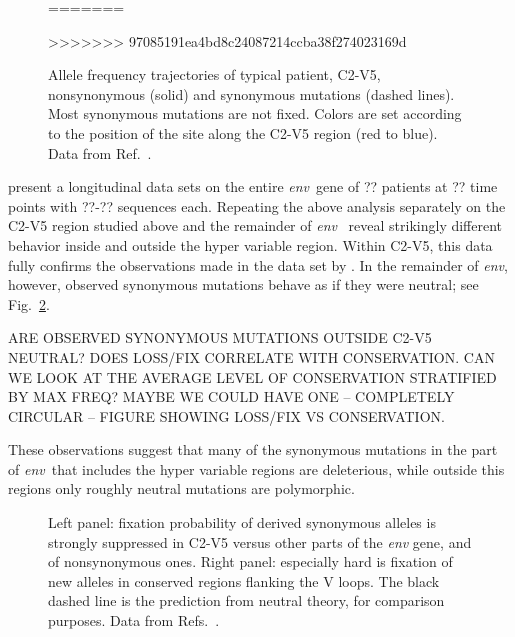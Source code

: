 \documentclass[rmp, twocolumn]{revtex4}
\newcommand{\env}{\textit{env}}
\newcommand{\FIG}[1]{Fig.~\ref{fig:#1}}
\begin{document}
\begin{figure}
\begin{center}
{}
=======
\caption{Allele frequency trajectories of typical patient, C2-V5, nonsynonymous
(solid) and synonymous mutations (dashed lines). Most synonymous mutations are
not fixed. Colors are set according to the position of the site along the C2-V5
region (red to blue). Data from Ref.~\cite{shankarappa_consistent_1999}.}
>>>>>>> 97085191ea4bd8c24087214ccba38f274023169d
\label{fig:aft}
\end{center}
\end{figure}

\citet{bunnik_autologous_2008} present a longitudinal data sets on the entire \env~gene of ?? patients at ?? time points with ??-?? sequences each. Repeating the above analysis separately on the C2-V5 region studied above and the remainder of \env~ reveal strikingly different behavior inside and outside the hyper variable region. Within C2-V5, this data fully confirms the observations made in the data set by \citet{shankarappa_consistent_1999}. In the remainder of \env, however, observed synonymous mutations behave as if they were neutral; see \FIG{fixp}. 

ARE OBSERVED SYNONYMOUS MUTATIONS OUTSIDE C2-V5 NEUTRAL? DOES LOSS/FIX CORRELATE WITH CONSERVATION. CAN WE LOOK AT THE AVERAGE LEVEL OF CONSERVATION STRATIFIED BY MAX FREQ? MAYBE WE COULD HAVE ONE -- COMPLETELY CIRCULAR -- FIGURE SHOWING LOSS/FIX VS CONSERVATION.

These observations suggest that many of the synonymous mutations in the part of \env~that includes the hyper variable regions are deleterious, while outside this regions only roughly neutral mutations are polymorphic.



\begin{figure}
\begin{center}
\caption{Left panel: fixation probability of derived synonymous alleles is strongly
suppressed in C2-V5 versus other parts of the {\it env} gene, and of
nonsynonymous ones.
Right panel: especially hard is fixation of new alleles in conserved regions flanking the V
loops. The black dashed line is the prediction from neutral
theory, for comparison purposes. Data from
Refs.~\cite{shankarappa_consistent_1999, bunnik_autologous_2008}.}
\label{fig:fixp}
\end{center}
\end{figure}
\end{document}
